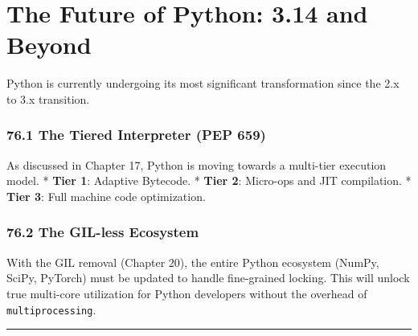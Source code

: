 \hypertarget{the-future-of-python-3.14-and-beyond}{%
\chapter{The Future of Python: 3.14 and
Beyond}\label{the-future-of-python-3.14-and-beyond}}

Python is currently undergoing its most significant transformation since
the 2.x to 3.x transition.

\hypertarget{the-tiered-interpreter-pep-659}{%
\subsection{76.1 The Tiered Interpreter (PEP
659)}\label{the-tiered-interpreter-pep-659}}

As discussed in Chapter 17, Python is moving towards a multi-tier
execution model. * \textbf{Tier 1}: Adaptive Bytecode. * \textbf{Tier
2}: Micro-ops and JIT compilation. * \textbf{Tier 3}: Full machine code
optimization.

\hypertarget{the-gil-less-ecosystem}{%
\subsection{76.2 The GIL-less Ecosystem}\label{the-gil-less-ecosystem}}

With the GIL removal (Chapter 20), the entire Python ecosystem (NumPy,
SciPy, PyTorch) must be updated to handle fine-grained locking. This
will unlock true multi-core utilization for Python developers without
the overhead of \passthrough{\lstinline!multiprocessing!}.

\begin{center}\rule{0.5\linewidth}{0.5pt}\end{center}
